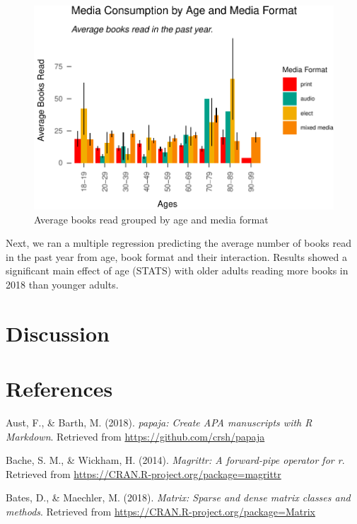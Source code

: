 \documentclass[man]{apa6}
\theoremstyle{definition}
\theoremstyle{definition}
\theoremstyle{definition}
\theoremstyle{remark}
\begin{document}
\begin{figure}
\centering
\includegraphics{final_manuscript_files/figure-latex/fig3-1.pdf}
\caption{\label{fig:fig3}Average books read grouped by age and media format}
\end{figure}

Next, we ran a multiple regression predicting the average number of
books read in the past year from age, book format and their interaction.
Results showed a significant main effect of age (STATS) with older
adults reading more books in 2018 than younger adults.

\section{Discussion}\label{discussion}

\newpage

\section{References}\label{references}

\begingroup
\setlength{\parindent}{-0.5in} \setlength{\leftskip}{0.5in}

\hypertarget{refs}{}
\hypertarget{ref-R-papaja}{}
Aust, F., \& Barth, M. (2018). \emph{papaja: Create APA manuscripts with
R Markdown}. Retrieved from \url{https://github.com/crsh/papaja}

\hypertarget{ref-R-magrittr}{}
Bache, S. M., \& Wickham, H. (2014). \emph{Magrittr: A forward-pipe
operator for r}. Retrieved from
\url{https://CRAN.R-project.org/package=magrittr}

\hypertarget{ref-R-Matrix}{}
Bates, D., \& Maechler, M. (2018). \emph{Matrix: Sparse and dense matrix
classes and methods}. Retrieved from
\url{https://CRAN.R-project.org/package=Matrix}
\end{document}
